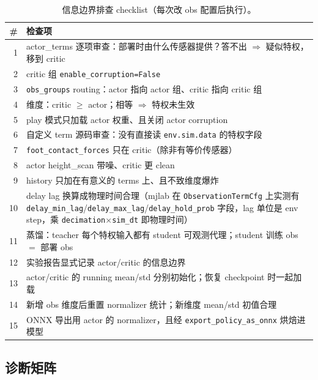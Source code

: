 \begin{table}[H]
\centering
\small
\caption{信息边界排查 checklist（每次改 obs 配置后执行）。}
\label{tab:rlmc-priv-checklist}
\begin{tabular}{@{}rp{10.6cm}@{}}
\toprule
\# & 检查项 \\
\midrule
1 & actor\_terms 逐项审查：部署时由什么传感器提供？答不出 $\Rightarrow$ 疑似特权，移到 critic \\
2 & critic 组 \texttt{enable\_corruption=False} \\
3 & \texttt{obs\_groups} routing：actor 指向 actor 组、critic 指向 critic 组 \\
4 & 维度：critic $\ge$ actor；相等 $\Rightarrow$ 特权未生效 \\
5 & play 模式只加载 actor 权重、且关闭 actor corruption \\
6 & 自定义 term 源码审查：没有直接读 \texttt{env.\allowbreak sim.\allowbreak data} 的特权字段 \\
7 & \texttt{foot\_contact\_forces} 只在 critic（除非有等价传感器） \\
8 & actor height\_scan 带噪、critic 更 clean \\
9 & history 只加在有意义的 terms 上、且不致维度爆炸 \\
10 & delay lag 换算成物理时间合理（mjlab 在 \texttt{ObservationTermCfg} 上实测有 \texttt{delay\_min\_lag}/\allowbreak\texttt{delay\_max\_lag}/\allowbreak\texttt{delay\_hold\_prob} 字段，lag 单位是 env step，乘 \texttt{decimation}$\times$\texttt{sim\_dt} 即物理时间） \\
11 & 蒸馏：teacher 每个特权输入都有 student 可观测代理；student 训练 obs $=$ 部署 obs \\
12 & 实验报告显式记录 actor/critic 的信息边界 \\
13 & actor/critic 的 running mean/std 分别初始化；恢复 checkpoint 时一起加载 \\
14 & 新增 obs 维度后重置 normalizer 统计；新维度 mean/std 初值合理 \\
15 & ONNX 导出用 actor 的 normalizer，且经 \texttt{export\_policy\_as\_onnx} 烘焙进模型 \\
\bottomrule
\end{tabular}
\end{table}

\subsection{诊断矩阵}
\label{sec:rlmc-priv-diagmatrix}

